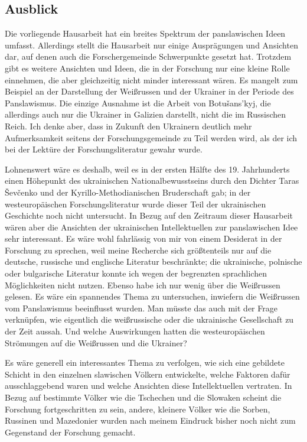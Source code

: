 \documentclass[12pt,headsepline,a4paper]{scrartcl}
\begin{document}
\subsection*{Ausblick}
Die vorliegende Hausarbeit hat ein breites Spektrum der panslawischen Ideen umfasst.
Allerdings stellt die Hausarbeit nur einige Ausprägungen und Ansichten dar, auf denen auch
die Forschergemeinde Schwerpunkte gesetzt hat. Trotzdem gibt es weitere Ansichten und
Ideen, die in der Forschung nur eine kleine Rolle einnehmen, die aber gleichzeitig nicht
minder interessant wären. Es mangelt zum Beispiel an der Darstellung der Weißrussen und
der Ukrainer in der Periode des Panslawismus. Die einzige Ausnahme ist die Arbeit von
Botušans'kyj\autocite{botushans}, die allerdings auch nur die Ukrainer in Galizien darstellt, nicht die im
Russischen Reich. Ich denke aber, dass in Zukunft den Ukrainern deutlich mehr
Aufmerksamkeit seitens der Forschungsgemeinde zu Teil werden wird, als der ich bei der
Lektüre der Forschungsliteratur gewahr wurde.

Lohnenswert wäre es deshalb, weil es in der ersten Hälfte des 19. Jahrhunderts einen
Höhepunkt des ukrainischen Nationalbewusstseins durch den Dichter Taras Ševčenko und der
Kyrillo-Methodianischen Bruderschaft gab; in der westeuropäischen Forschungsliteratur
wurde dieser Teil der ukrainischen Geschichte noch nicht untersucht. In Bezug auf den
Zeitraum dieser Hausarbeit wären aber die Ansichten der ukrainischen Intellektuellen zur
panslawischen Idee sehr interessant. Es wäre wohl fahrlässig von mir von einem Desiderat in
der Forschung zu sprechen, weil meine Recherche sich größtenteils nur auf die deutsche,
russische und englische Literatur beschränkte; die ukrainische, polnische oder bulgarische
Literatur konnte ich wegen der begrenzten sprachlichen Möglichkeiten nicht nutzen. Ebenso
habe ich nur wenig über die Weißrussen gelesen. Es wäre ein spannendes Thema zu
untersuchen, inwiefern die Weißrussen vom Panslawismus beeinflusst wurden. Man müsste
das auch mit der Frage verknüpfen, wie eigentlich die weißrussische oder die ukrainische
Gesellschaft zu der Zeit aussah. Und welche Auswirkungen hatten die westeuropäischen
Strömungen auf die Weißrussen und die Ukrainer?

Es wäre generell ein interessantes Thema zu verfolgen, wie sich eine gebildete Schicht in den
einzelnen slawischen Völkern entwickelte, welche Faktoren dafür ausschlaggebend waren und
welche Ansichten diese Intellektuellen vertraten. In Bezug auf bestimmte Völker wie die
Tschechen und die Slowaken scheint die Forschung fortgeschritten zu sein, andere, kleinere
Völker wie die Sorben, Russinen und Mazedonier wurden nach meinem Eindruck bisher noch
nicht zum Gegenstand der Forschung gemacht.

\printbibliography
\end{document}
